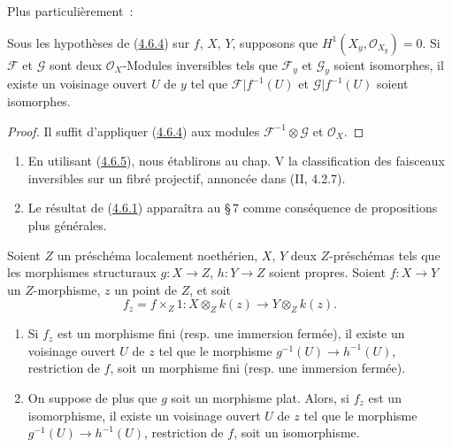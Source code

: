 Plus particulièrement~:

\begin{corollary}[4.6.5]
\label{III.4.6.5-fr}
Sous les hypothèses de (\hyperref[III.4.6.4-fr]{4.6.4}) sur $f$, $X$, $Y$,
supposons que $H^1(X_y,\mathcal O_{X_y})=0$. Si $\mathcal F$ et $\mathcal G$
sont deux $\mathcal O_X$-Modules inversibles tels que $\mathcal F_y$ et
$\mathcal G_y$ soient isomorphes, il existe un voisinage ouvert $U$ de $y$
tel que $\mathcal F|f^{-1}(U)$ et $\mathcal G|f^{-1}(U)$ soient isomorphes.
\end{corollary}

\begin{proof}
Il suffit d'appliquer (\hyperref[III.4.6.4-fr]{4.6.4}) aux modules
$\mathcal F^{-1}\otimes\mathcal G$ et $\mathcal O_X$.
\end{proof}

\begin{remarks}[4.6.6]
\label{III.4.6.6-fr}
\begin{enumerate}
\item[(i)] En utilisant (\hyperref[III.4.6.5-fr]{4.6.5}), nous établirons au
chap. V la classification des faisceaux inversibles sur un fibré projectif,
annoncée dans (II, 4.2.7).
\item[(ii)] Le résultat de (\hyperref[III.4.6.1-fr]{4.6.1}) apparaîtra au
\S\,7 comme conséquence de propositions plus générales.
\end{enumerate}
\end{remarks}

\begin{proposition}[4.6.7]
\label{III.4.6.7-fr}
Soient $Z$ un préschéma localement noethérien, $X$, $Y$ deux $Z$-préschémas
tels que les morphismes structuraux $g:X\to Z$, $h:Y\to Z$ soient propres.
Soient $f:X\to Y$ un $Z$-morphisme, $z$ un point de $Z$, et soit
\[
f_z=f\times_Z1:
X\otimes_Zk(z)\longrightarrow Y\otimes_Zk(z).
\]
\begin{enumerate}
\item[(i)] Si $f_z$ est un morphisme fini (resp. une immersion fermée), il
existe un voisinage ouvert $U$ de $z$ tel que le morphisme
$g^{-1}(U)\to h^{-1}(U)$, restriction de $f$, soit un morphisme fini (resp.
une immersion fermée).
\item[(ii)] On suppose de plus que $g$ soit un morphisme plat. Alors, si
$f_z$ est un isomorphisme, il existe un voisinage ouvert $U$ de $z$ tel que
le morphisme $g^{-1}(U)\to h^{-1}(U)$, restriction de $f$, soit un
isomorphisme.
\end{enumerate}
\end{proposition}

